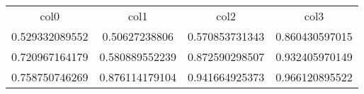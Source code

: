 \begin{table}
\begin{tabular}{cccc}
col0 & col1 & col2 & col3 \\
0.529332089552 & 0.50627238806 & 0.570853731343 & 0.860430597015 \\
0.720967164179 & 0.580889552239 & 0.872590298507 & 0.932405970149 \\
0.758750746269 & 0.876114179104 & 0.941664925373 & 0.966120895522 \\
\end{tabular}
\end{table}
